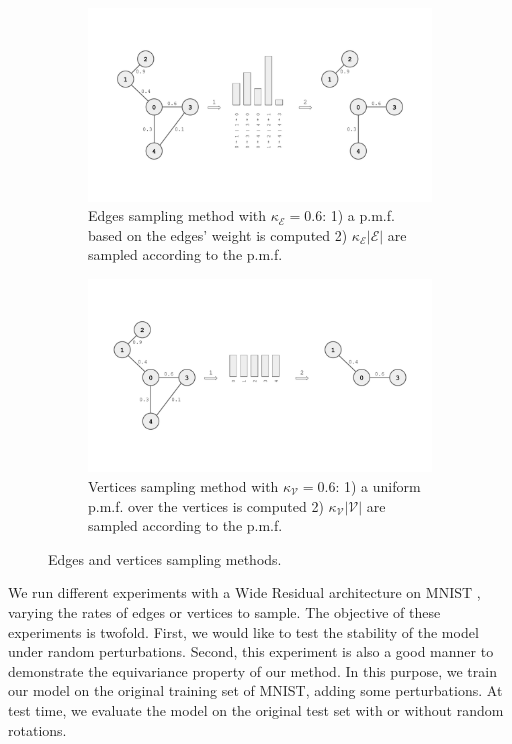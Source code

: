 \documentclass{article}
\begin{document}
\begin{figure}[h!] 
    \centering
    \begin{subfigure}[b]{0.48\textwidth}
        \centering
        \includegraphics[width=\textwidth]{Images/edge_sampling.pdf}
        \caption{Edges sampling method with $\kappa_\mathcal{E} = 0.6$: 1) a p.m.f. based on the edges' weight is computed 2) $\kappa_\mathcal{E} |\mathcal{E}|$ are sampled according to the p.m.f.}
    \end{subfigure}
    \hfill
    \begin{subfigure}[b]{0.48\textwidth}
        \centering
        \includegraphics[width=\textwidth]{Images/vertex_sampling.pdf}
        \caption{Vertices sampling method with $\kappa_\mathcal{V} = 0.6$: 1) a uniform p.m.f. over the vertices is computed 2) $\kappa_\mathcal{V} |\mathcal{V}|$ are sampled according to the p.m.f.}
    \end{subfigure}
    \caption{Edges and vertices sampling methods.}
    \label{fig:sampling}
\end{figure}

We run different experiments with a Wide Residual architecture on MNIST \citep{lecun1998gradient}, varying the rates of edges or vertices to sample. The objective of these experiments is twofold. First, we would like to test the stability of the model under random perturbations. Second, this experiment is also a good manner to demonstrate the equivariance property of our method. In this purpose, we train our model on the original training set of MNIST, adding some perturbations. At test time, we evaluate the model on the original test set with or without random rotations. 
\end{document}
